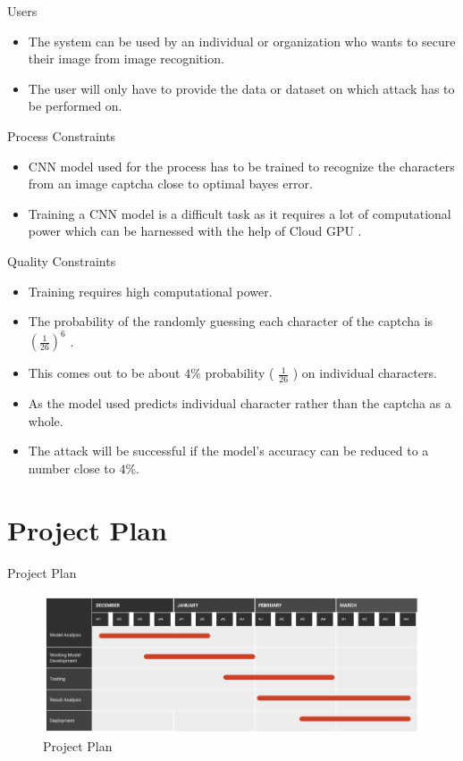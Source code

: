 \documentclass[10pt]{beamer}
\begin{document}
\begin{frame}{Users}
	\begin{itemize}
	    
	    \item The system can be used by an individual or organization who wants to secure their image from image recognition.
	    
	    \item The user will only have to provide the data or dataset on which attack has to be performed on.
	    
	\end{itemize}
\end{frame}


\begin{frame}{Process Constraints}
    \begin{itemize}
	    
	    \item CNN model used for the process has to be trained to recognize the characters from an image captcha close to optimal bayes error.
	    
	    \item Training a CNN model is a difficult task as it requires a lot of computational power which can be harnessed with the help of Cloud GPU .
	      
	\end{itemize}            
\end{frame}
\begin{frame}{Quality Constraints}
\begin{itemize}
    \item Training requires high computational power.
    \item The probability of the randomly guessing each character of the captcha is $ (\frac{1}{26})^6 $ .
    \item This comes out to be about $ 4 \% $ probability ( $ \frac{1}{26} $ )  on individual characters.
    \item As the model used predicts individual character rather than the captcha as a whole.
    \item The attack will be successful if the model's accuracy can be reduced to a number close to $ 4 \%$. 
\end{itemize}
\end{frame}
\section{Project Plan}
\begin{frame}{Project Plan}
\begin{figure}
    \centering
    \includegraphics[width=4.5in]{chart.png}
    \caption{Project Plan}
\end{figure}
\end{frame}
\end{document}
